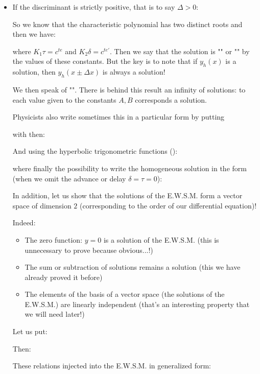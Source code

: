 	\begin{itemize}
		\item If the discriminant is strictly positive, that is to say $\Delta>0$:
		
		So we know that the characteristic polynomial has two distinct roots and then we have:
		
		where $K_1\tau=c^{te}$ and $K_2\delta=c^{te'}$. Then we say that the solution is "" or "" by the values of these constants. But the key is to note that if $y_h(x)$ is a solution, then $y_h(x\pm \Delta x)$ is always a solution!
		
		We then speak of "". There is behind this result an infinity of solutions: to each value given to the constants $A, B$ corresponds a solution.
		
		Physicists also write sometimes this in a particular form by putting
		
		with then:
		
		And using the hyperbolic trigonometric functions ():
		
		where finally the possibility to write the homogeneous solution in the form (when we omit the advance or delay $\delta=\tau=0$):
		
		In addition, let us show that the solutions of the E.W.S.M. form a vector space of dimension $2$ (corresponding to the order of our differential equation)!
		
		Indeed:
		\begin{itemize}
			\item The zero function: $y=0$ is a solution of the E.W.S.M. (this is unnecessary to prove because obvious...!)
			
			\item The sum or subtraction of solutions remains a solution (this we have already proved it before)
			
			\item The elements of the basis of a vector space (the solutions of the E.W.S.M.) are linearly independent (that's an interesting property that we will need later!)
		\end{itemize}
		Let us put:
		
		Then:
		
		These relations injected into the E.W.S.M. in generalized form:
		

\end{itemize}
